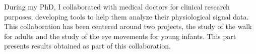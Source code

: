 \documentclass[../thesis.tex]{subfiles}
\begin{document}
	During my PhD, I collaborated with medical doctors for clinical research purposes,
	developing tools to help them analyze their physiological signal data. This collaboration
	has been centered around two projects, the study of the walk for adults and the study
	of the eye movements for young infants. This part presents results obtained as part of this
	collaboration.

\biblio{}
\end{document}
